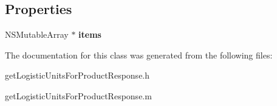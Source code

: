 \subsection*{Properties}
\begin{DoxyCompactItemize}
\item 
\hypertarget{interfaceget_logistic_units_for_product_response_a69315abb3663b3177fd5cefaf287da09}{}N\+S\+Mutable\+Array $\ast$ {\bfseries items}\label{interfaceget_logistic_units_for_product_response_a69315abb3663b3177fd5cefaf287da09}

\end{DoxyCompactItemize}


The documentation for this class was generated from the following files\+:\begin{DoxyCompactItemize}
\item 
get\+Logistic\+Units\+For\+Product\+Response.\+h\item 
get\+Logistic\+Units\+For\+Product\+Response.\+m\end{DoxyCompactItemize}
